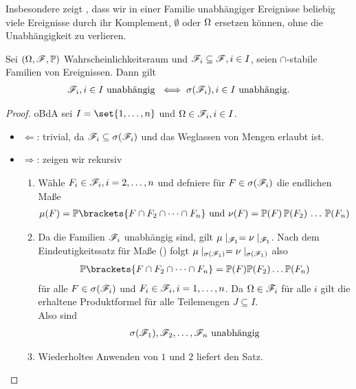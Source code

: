 Insbesondere zeigt , dass wir in einer Familie unabhängiger Ereignisse beliebig viele Ereignisse durch ihr Komplement, $\emptyset$ oder $\Omega$ ersetzen können, ohne die Unabhängigkeit zu verlieren.
\begin{proposition}
	Sei $(\Omega, \mathscr F, \mathbb{P})$ Wahrscheinlichkeitsraum und $\mathscr F_i \subseteq \mathscr F, i \in I$, seien $\cap$-stabile Familien von Ereignissen. Dann gilt
	\begin{align*}
	\mathscr F_i, i \in I \text{ unabhängig } \iff \sigma(\mathscr F_i), i \in I \text{ unabhängig}. 
	\end{align*}
\end{proposition}
\begin{proof}
	oBdA sei $I = \set{1, \dots, n}$ und $\Omega \in \mathscr F_i, i \in I$.
	\begin{itemize}
		\item $\Leftarrow$: trivial, da $\mathscr F_i \subseteq \sigma(\mathscr F_i)$ und das Weglassen von Mengen erlaubt ist.
		\item $\Rightarrow$: zeigen wir rekursiv
		\begin{enumerate}
			\item Wähle $F_i \in \mathscr F_i, i = 2, \dots,n$ und defniere für $F \in \sigma(\mathscr F_i)$ die endlichen Maße
			\begin{align*}
				\mu(F) = \P\brackets{ F \cap F_2 \cap \cdots \cap F_n} \und \nu(F) = \P(F) \, \P(F_2) \, \dots \, \P(F_n)
			\end{align*}
			\item Da die Familien $\mathscr F_i$ unabhängig sind, gilt
			$\mu\mid_{\mathscr F_1} = \nu\mid_{\mathscr F_1}$.
			Nach dem Eindeutigkeitssatz für Maße () folgt $\mu\mid_{\sigma(\mathscr F_1)} = \nu\mid_{\sigma(\mathscr F_1)}$ also
			\begin{align*}
				\P\brackets{ F \cap F_2 \cap \cdots \cap F_n} = \P(F) \P(F_2) \dots \P(F_n)
			\end{align*}
			für alle $F \in \sigma(\mathscr F_i)$ und $F_i \in \mathscr F_i, i = 1, \dots, n$. Da $\Omega \in \mathscr F_i$ für alle $i$ gilt die erhaltene Produktformel für alle Teilemengen $J \subseteq I$.\\
			Also sind
			\begin{align*}
			\sigma(\mathscr F_1), \mathscr F_2, \dots, \mathscr F_n \text{ unabhängig}
			\end{align*}
			\item Wiederholtes Anwenden von $1$ und $2$ liefert den Satz.
		\end{enumerate}
	\end{itemize}
\end{proof}
